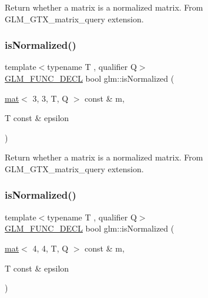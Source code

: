 Return whether a matrix is a normalized matrix. From G\+L\+M\+\_\+\+G\+T\+X\+\_\+matrix\+\_\+query extension. \mbox{\label{group__gtx__matrix__query_gaa068311695f28f5f555f5f746a6a66fb}} 
\subsubsection{\texorpdfstring{is\+Normalized()}{isNormalized()}\hspace{0.1cm}{\footnotesize\ttfamily [2/3]}}
{\footnotesize\ttfamily template$<$typename T , qualifier Q$>$ \\
\mbox{\hyperlink{setup_8hpp_ab2d052de21a70539923e9bcbf6e83a51}{G\+L\+M\+\_\+\+F\+U\+N\+C\+\_\+\+D\+E\+CL}} bool glm\+::is\+Normalized (\begin{DoxyParamCaption}\item[{\mbox{\hyperlink{structglm_1_1mat}{mat}}$<$ 3, 3, T, Q $>$ const \&}]{m,  }\item[{T const \&}]{epsilon }\end{DoxyParamCaption})}

Return whether a matrix is a normalized matrix. From G\+L\+M\+\_\+\+G\+T\+X\+\_\+matrix\+\_\+query extension. \mbox{\label{group__gtx__matrix__query_ga4d9bb4d0465df49fedfad79adc6ce4ad}} 
\subsubsection{\texorpdfstring{is\+Normalized()}{isNormalized()}\hspace{0.1cm}{\footnotesize\ttfamily [3/3]}}
{\footnotesize\ttfamily template$<$typename T , qualifier Q$>$ \\
\mbox{\hyperlink{setup_8hpp_ab2d052de21a70539923e9bcbf6e83a51}{G\+L\+M\+\_\+\+F\+U\+N\+C\+\_\+\+D\+E\+CL}} bool glm\+::is\+Normalized (\begin{DoxyParamCaption}\item[{\mbox{\hyperlink{structglm_1_1mat}{mat}}$<$ 4, 4, T, Q $>$ const \&}]{m,  }\item[{T const \&}]{epsilon }\end{DoxyParamCaption})}

